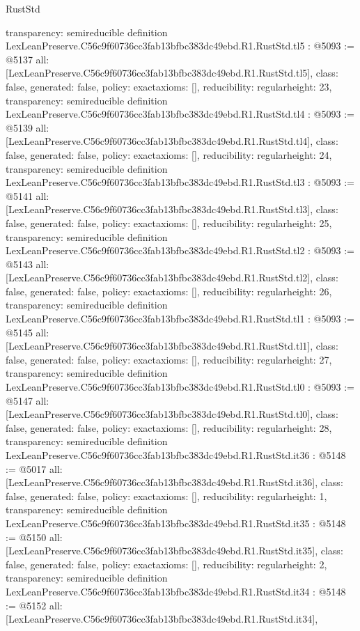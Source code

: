 \begin{lexlean}{RustStd}
\begin{coremodule}
{  transparency: semireducible
}
definition LexLeanPreserve.C56c9f60736cc3fab13bfbc383dc49ebd.R1.RustStd.tl5 : @5093 := @5137 {
  all: [LexLeanPreserve.C56c9f60736cc3fab13bfbc383dc49ebd.R1.RustStd.tl5],
  class: false,
  generated: false,
  policy: exact{axioms: []},
  reducibility: regular{height: 23},
  transparency: semireducible
}
definition LexLeanPreserve.C56c9f60736cc3fab13bfbc383dc49ebd.R1.RustStd.tl4 : @5093 := @5139 {
  all: [LexLeanPreserve.C56c9f60736cc3fab13bfbc383dc49ebd.R1.RustStd.tl4],
  class: false,
  generated: false,
  policy: exact{axioms: []},
  reducibility: regular{height: 24},
  transparency: semireducible
}
definition LexLeanPreserve.C56c9f60736cc3fab13bfbc383dc49ebd.R1.RustStd.tl3 : @5093 := @5141 {
  all: [LexLeanPreserve.C56c9f60736cc3fab13bfbc383dc49ebd.R1.RustStd.tl3],
  class: false,
  generated: false,
  policy: exact{axioms: []},
  reducibility: regular{height: 25},
  transparency: semireducible
}
definition LexLeanPreserve.C56c9f60736cc3fab13bfbc383dc49ebd.R1.RustStd.tl2 : @5093 := @5143 {
  all: [LexLeanPreserve.C56c9f60736cc3fab13bfbc383dc49ebd.R1.RustStd.tl2],
  class: false,
  generated: false,
  policy: exact{axioms: []},
  reducibility: regular{height: 26},
  transparency: semireducible
}
definition LexLeanPreserve.C56c9f60736cc3fab13bfbc383dc49ebd.R1.RustStd.tl1 : @5093 := @5145 {
  all: [LexLeanPreserve.C56c9f60736cc3fab13bfbc383dc49ebd.R1.RustStd.tl1],
  class: false,
  generated: false,
  policy: exact{axioms: []},
  reducibility: regular{height: 27},
  transparency: semireducible
}
definition LexLeanPreserve.C56c9f60736cc3fab13bfbc383dc49ebd.R1.RustStd.tl0 : @5093 := @5147 {
  all: [LexLeanPreserve.C56c9f60736cc3fab13bfbc383dc49ebd.R1.RustStd.tl0],
  class: false,
  generated: false,
  policy: exact{axioms: []},
  reducibility: regular{height: 28},
  transparency: semireducible
}
definition LexLeanPreserve.C56c9f60736cc3fab13bfbc383dc49ebd.R1.RustStd.it36 : @5148 := @5017 {
  all: [LexLeanPreserve.C56c9f60736cc3fab13bfbc383dc49ebd.R1.RustStd.it36],
  class: false,
  generated: false,
  policy: exact{axioms: []},
  reducibility: regular{height: 1},
  transparency: semireducible
}
definition LexLeanPreserve.C56c9f60736cc3fab13bfbc383dc49ebd.R1.RustStd.it35 : @5148 := @5150 {
  all: [LexLeanPreserve.C56c9f60736cc3fab13bfbc383dc49ebd.R1.RustStd.it35],
  class: false,
  generated: false,
  policy: exact{axioms: []},
  reducibility: regular{height: 2},
  transparency: semireducible
}
definition LexLeanPreserve.C56c9f60736cc3fab13bfbc383dc49ebd.R1.RustStd.it34 : @5148 := @5152 {
  all: [LexLeanPreserve.C56c9f60736cc3fab13bfbc383dc49ebd.R1.RustStd.it34],
}
\end{coremodule}
\end{lexlean}
